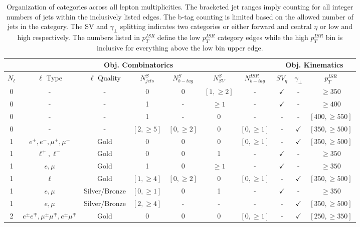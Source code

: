 \begin{table}
\label{tab:cats}
\caption{Organization of categories across all lepton multiplicities. The bracketed jet ranges imply counting for all integer numbers of jets within the inclusively listed edges. The b-tag counting is limited based on the allowed number of jets in the category. The SV and $\gamma_\perp$ splitting indicates two categories or either forward and central $\eta$ or low and high respectively. The numbers listed in $p_T^{ISR}$ define the low $p_T^{ISR}$ category edges while the high $p_T^{ISR}$ bin is inclusive for everything above the low bin upper edge.}
\begin{adjustwidth}{-0.7in}{-1in}

\begin{tabular}{|c|c|c|c|c|c|c|c|c|c|}
\multicolumn{7}{c|}{Obj. Combinatorics} & \multicolumn{3}{c}{Obj. Kinematics} \\
\hline 
$N_\ell$ &  $\ell$ Type & $\ell$ Quality & $N_{jets}^{S}$ & $N_{b-tag}^{S}$ & $N_{SV}^S$ & $N_{b-tag}^{ISR}$ & $SV_\eta$ & $\gamma_\perp$ & $p_T^{ISR}$ \\ 
\hline
\hline 
0 & - & - & 0 & 0 & $[1,\geq 2]$ & - & $\checkmark$ & - & $\geq 350$ \\ 
0 & - & - & 1 & - & $\geq 1$ &    - & $\checkmark$ & - & $\geq 400$ \\
0 & - & - & 1 & - &  0       &    - &  -           & - & $[400,\geq 550]$ \\
0 & - & - & $[2,\geq 5]$ & $[0,\geq 2]$ & 0 & $[0,\geq 1]$ & - & $\checkmark$ & $[350,\geq500]$ \\
\hline 
1 & $e^+,e^-,\mu^+,\mu^-$& Gold & 0 & 0 & 0 & $[0,\geq 1]$ & - & $\checkmark$ & $[350, \geq 500]$ \\
1 & $\ell^+, \ell^-$  & Gold & 0 & 0 & 1 & - & $\checkmark$ & - & $\geq 350$ \\
1 & $e, \mu$ & Gold & 1 & 0 &  $\geq 1$ & - & $\checkmark$ & - & $\geq 350$ \\
1 & $\ell$ & Gold & $[1,\geq 4]$ & $[0,\geq 2]$ & 0 & $[0,\geq 1]$ & - & $\checkmark$ & $[350, \geq 500]$ \\
1 & $e, \mu$ & Silver/Bronze & $[0,\geq 1]$ & 0 & 1 & - & $\checkmark$ & - & $\geq 350$ \\
1 & $e, \mu$ & Silver/Bronze & $[2, \geq 4]$ & - & - & - & - & $\checkmark$ & $[350, \geq 500]$ \\
\hline
2 & $e^\pm e^\mp, \mu^\pm \mu^\mp, e^\pm \mu^\mp $ & Gold & 0 & 0 & 0 & $[0,\geq 1]$ & - & $\checkmark$ & $[250,\geq350]$  \\

\end{tabular}
\end{adjustwidth}
\end{table}
